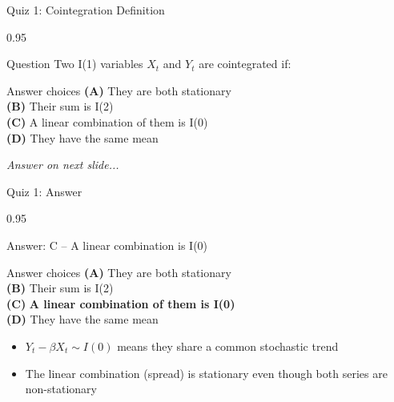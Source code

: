 \documentclass[9pt, aspectratio=169, t]{beamer}
\begin{document}
\begin{frame}{Quiz 1: Cointegration Definition}
    \begin{cminipage}{0.95\textwidth}
    \begin{alertblock}{Question}
        Two I(1) variables $X_t$ and $Y_t$ are cointegrated if:
    \end{alertblock}

    \vspace{0.4cm}

    \begin{block}{Answer choices}
        \textcolor{MainBlue}{\textbf{(A)}} They are both stationary\\[3pt]
        \textcolor{MainBlue}{\textbf{(B)}} Their sum is I(2)\\[3pt]
        \textcolor{MainBlue}{\textbf{(C)}} A linear combination of them is I(0)\\[3pt]
        \textcolor{MainBlue}{\textbf{(D)}} They have the same mean
    \end{block}

    \vspace{0.5cm}

    \begin{center}
        \textit{Answer on next slide...}
    \end{center}
    \end{cminipage}
\end{frame}

\begin{frame}{Quiz 1: Answer}
    \begin{cminipage}{0.95\textwidth}
    \begin{exampleblock}{Answer: C -- A linear combination is I(0)}

    \begin{block}{Answer choices}
        \textcolor{MainBlue}{\textbf{(A)}} They are both stationary \incorrect\\[3pt]
        \textcolor{MainBlue}{\textbf{(B)}} Their sum is I(2) \incorrect\\[3pt]
        \textcolor{MainBlue}{\textbf{(C)}} \textbf{\textcolor{Forest}{A linear combination of them is I(0)}} \correct\\[3pt]
        \textcolor{MainBlue}{\textbf{(D)}} They have the same mean \incorrect
    \end{block}

        \vspace{0.3cm}

        \begin{itemize}
            \item $Y_t - \beta X_t \sim I(0)$ means they share a common stochastic trend
            \item The linear combination (spread) is stationary even though both series are non-stationary
        \end{itemize}
    \end{exampleblock}

    \end{cminipage}
\end{frame}
\end{document}
